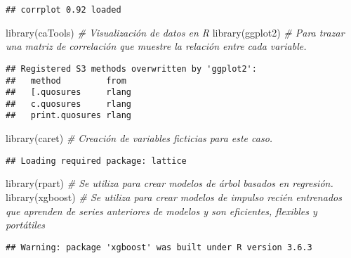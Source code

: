 \documentclass[]{article}
\newenvironment{Shaded}{\begin{snugshade}}{\end{snugshade}}
\newcommand{\CommentTok}[1]{\textcolor[rgb]{0.56,0.35,0.01}{\textit{#1}}}
\newcommand{\FunctionTok}[1]{\textcolor[rgb]{0.00,0.00,0.00}{#1}}
\newcommand{\NormalTok}[1]{#1}
\newcommand{\StringTok}[1]{\textcolor[rgb]{0.31,0.60,0.02}{#1}}
\begin{document}
\begin{verbatim}
## corrplot 0.92 loaded
\end{verbatim}

\begin{Shaded}
\begin{Highlighting}[]
\FunctionTok{library}\NormalTok{(}\StringTok{\textquotesingle{}caTools\textquotesingle{}}\NormalTok{) }\CommentTok{\# Visualización de datos en R}
\FunctionTok{library}\NormalTok{(}\StringTok{\textquotesingle{}ggplot2\textquotesingle{}}\NormalTok{) }\CommentTok{\# Para trazar una matriz de correlación que muestre la relación entre cada variable.}
\end{Highlighting}
\end{Shaded}

\begin{verbatim}
## Registered S3 methods overwritten by 'ggplot2':
##   method         from 
##   [.quosures     rlang
##   c.quosures     rlang
##   print.quosures rlang
\end{verbatim}

\begin{Shaded}
\begin{Highlighting}[]
\FunctionTok{library}\NormalTok{(}\StringTok{\textquotesingle{}caret\textquotesingle{}}\NormalTok{) }\CommentTok{\# Creación de variables ficticias para este caso.}
\end{Highlighting}
\end{Shaded}

\begin{verbatim}
## Loading required package: lattice
\end{verbatim}

\begin{Shaded}
\begin{Highlighting}[]
\FunctionTok{library}\NormalTok{(}\StringTok{\textquotesingle{}rpart\textquotesingle{}}\NormalTok{) }\CommentTok{\# Se utiliza para crear modelos de árbol basados en regresión.}
\FunctionTok{library}\NormalTok{(}\StringTok{\textquotesingle{}xgboost\textquotesingle{}}\NormalTok{) }\CommentTok{\# Se utiliza para crear modelos de impulso recién entrenados que aprenden de series anteriores de modelos y son eficientes, flexibles y portátiles}
\end{Highlighting}
\end{Shaded}

\begin{verbatim}
## Warning: package 'xgboost' was built under R version 3.6.3
\end{verbatim}
\end{document}
